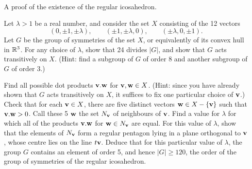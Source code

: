 \documentclass{amsart}
\def\vv{{\bf v}}
\def\ww{{\bf w}}
\def\R{{\Bbb R}}
\begin{document}
\centerline{A proof of the existence of the regular icosahedron.}


Let $\lambda > 1$ be a real number, and consider the set $X$ 
consisting of the 12 vectors 
$$(0,\pm 1,\pm\lambda), \qquad 
(\pm 1,\pm\lambda,0), \qquad 
(\pm\lambda,0,\pm 1).$$ 
Let $G$ be the group of symmetries of the set $X$, or equivalently 
of its convex hull in $\R^3$.  
For any choice of $\lambda$, show that 24 divides $|G|$, and 
show that $G$ acts transitively on $X$.  (Hint: 
find a subgroup of $G$ of order 8 and another subgroup of $G$ of 
order 3.)  

Find all possible dot products $\vv.\ww$ for $\vv,\ww\in X$.  
(Hint: since you have already shown that $G$ acts 
transitively on $X$, it suffices to fix one particular choice of
$\vv$.)  Check that for each $\vv\in X$, there are five distinct 
vectors $\ww\in X - \{\vv\}$ such 
that $\vv.\ww>0$.  Call these 5 $\ww$ the set $N_\vv$ of neighbours of
$\vv$.  Find a value for $\lambda$ for which all of the products 
$\vv.\ww$ for $\ww\in N_\vv$ are equal.  For this value of $\lambda$, 
show that the elements of $N_\vv$ form a regular pentagon lying in a 
plane orthogonal to $\vv$, whose centre lies on the line $t\vv$.  
Deduce that for this particular value of $\lambda$, the group $G$ 
contains an element of order 5, and hence $|G| \geq 120$, the order 
of the group of symmetries of the regular icosahedron.  
\end{document}
